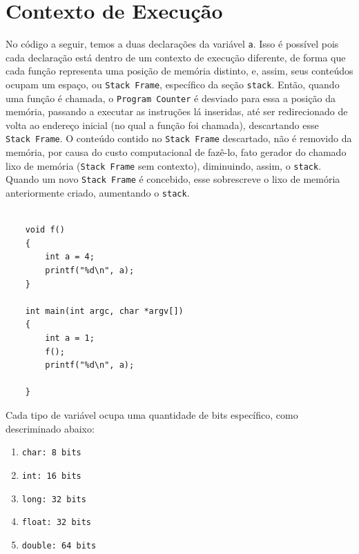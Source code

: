 \hypertarget{contexto-de-execuuxe7uxe3o}{%
\section{Contexto de Execução}\label{contexto-de-execuuxe7uxe3o}}

No código a seguir, temos a duas declarações da variável \texttt{a}.
Isso é possível pois cada declaração está dentro de um contexto de
execução diferente, de forma que cada função representa uma posição de
memória distinto, e, assim, seus conteúdos ocupam um espaço, ou
\texttt{Stack\ Frame}, específico da seção \texttt{stack}. Então, quando
uma função é chamada, o \texttt{Program\ Counter} é desviado para essa a
posição da memória, passando a executar as instruções lá inseridas, até
ser redirecionado de volta ao endereço inicial (no qual a função foi
chamada), descartando esse \texttt{Stack\ Frame}. O conteúdo contido no
\texttt{Stack\ Frame} descartado, não é removido da memória, por causa
do custo computacional de fazê-lo, fato gerador do chamado lixo de
memória (\texttt{Stack\ Frame} sem contexto), diminuindo, assim, o
\texttt{stack}. Quando um novo \texttt{Stack\ Frame} é concebido, esse
sobrescreve o lixo de memória anteriormente criado, aumentando o
\texttt{stack}.


\begin{verbatim}

    void f()
    {
        int a = 4;
        printf("%d\n", a);
    }
    
    int main(int argc, char *argv[])
    {
        int a = 1;
        f();
        printf("%d\n", a);
    
    }

\end{verbatim}




Cada tipo de variável ocupa uma quantidade de bits específico, como
descriminado abaixo:

\begin{enumerate}
\def\labelenumi{\arabic{enumi}.}
\tightlist
\item
  \texttt{char:\ 8\ bits}
\item
  \texttt{int:\ 16\ bits}
\item
  \texttt{long:\ 32\ bits}
\item
  \texttt{float:\ 32\ bits}
\item
  \texttt{double:\ 64\ bits}
\end{enumerate}

